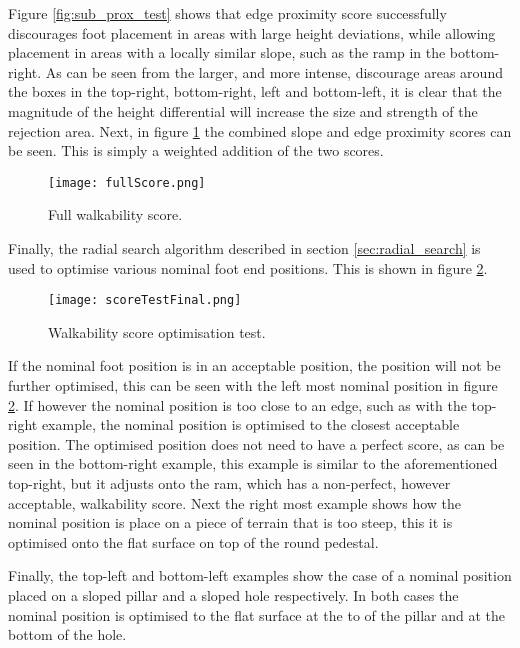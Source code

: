     Figure \ref{fig:sub_prox_test} shows that edge proximity score successfully discourages foot placement in areas with large height deviations,
    while allowing placement in areas with a locally similar slope, such as the ramp in the bottom-right. As can be seen from the larger, and more intense, discourage areas around the boxes in the
    top-right, bottom-right, left and bottom-left, it is clear that the magnitude of the height differential will increase the size and strength of the rejection area.
    Next, in figure \ref{fig:full_score} the combined slope and edge proximity scores can be seen. This is simply a weighted addition of the two scores.
    \begin{figure}[h]
        \centering
        \texttt{[image: fullScore.png]}
        \caption{Full walkability score.}
        \label{fig:full_score}
    \end{figure}

    Finally, the radial search algorithm described in section \ref{sec:radial_search} is used to optimise various nominal foot end positions.
    This is shown in figure \ref{fig:optimisation_test}.
    \begin{figure}[h]
        \centering
        \texttt{[image: scoreTestFinal.png]}
        \caption{Walkability score optimisation test.}
        \label{fig:optimisation_test}
    \end{figure}
    If the nominal foot position is in an acceptable position, the position will not be further optimised, this can be seen with the left most
    nominal position in figure \ref{fig:optimisation_test}. If however the nominal position is too close to an edge, such as with the top-right example, 
    the nominal position is optimised to the closest acceptable position. The optimised position does not need to have a perfect score, as can be seen in the bottom-right example, this example is similar to 
    the aforementioned top-right, but it adjusts onto the ram, which has a non-perfect, however acceptable, walkability score.
    Next the right most example shows how the nominal position is place on a piece of terrain that is too steep, this it is optimised onto the flat surface on top of the round pedestal. 
    
    Finally, the top-left and bottom-left examples show the case of a nominal position placed on a sloped pillar and a sloped hole respectively.
    In both cases the nominal position is optimised to the flat surface at the to of the pillar and at the bottom of the hole.
    
